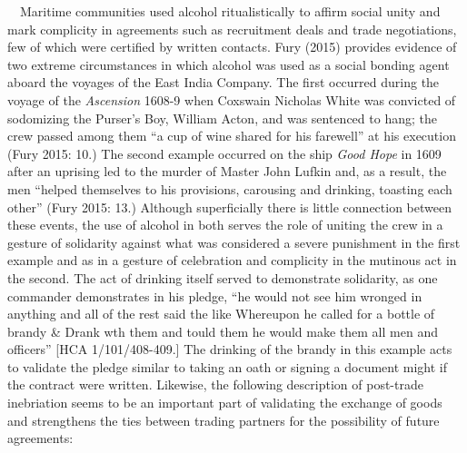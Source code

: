 \documentclass[12pt]{article}
\newenvironment{styleStandard}{\renewcommand\baselinestretch{1.0}\setlength\leftskip{0cm}\setlength\rightskip{0cm plus 1fil}\setlength\parindent{0cm}\setlength\parfillskip{0pt plus 1fil}\setlength\parskip{0in plus 1pt}\writerlistparindent\writerlistleftskip\leavevmode\normalfont\normalsize\writerlistlabel\ignorespaces}{\unskip\vspace{0in plus 1pt}\par}
\newcommand\writerlistleftskip{}
\newcommand\writerlistparindent{}
\newcommand\writerlistlabel{}
\begin{document}
\begin{styleStandard}
\ \ Maritime communities used alcohol ritualistically to affirm social unity and mark complicity in agreements such as recruitment deals and trade negotiations, few of which were certified by written contacts. Fury (2015) provides evidence of two extreme circumstances in which alcohol was used as a social bonding agent aboard the voyages of the East India Company. The first occurred during the voyage of the \textit{Ascension }1608-9 when Coxswain Nicholas White was convicted of sodomizing the Purser’s Boy, William Acton, and was sentenced to hang; the crew passed among them “a cup of wine shared for his farewell” at his execution (Fury 2015: 10.) The second example occurred on the ship \textit{Good Hope} in 1609 after an uprising led to the murder of Master John Lufkin and, as a result, the men “helped themselves to his provisions, carousing and drinking, toasting each other” (Fury 2015: 13.) Although superficially there is little connection between these events, the use of alcohol in both serves the role of uniting the crew in a gesture of solidarity against what was considered a severe punishment in the first example and as in a gesture of celebration and complicity in the mutinous act in the second. The act of drinking itself served to demonstrate solidarity, as one commander demonstrates in his pledge, “he would not see him wronged in anything and all of the rest said the like Whereupon he called for a bottle of brandy \& Drank wth them and tould them he would make them all men and officers” [HCA 1/101/408-409.] The drinking of the brandy in this example acts to validate the pledge similar to taking an oath or signing a document might if the contract were written. Likewise, the following description of post-trade inebriation seems to be an important part of validating the exchange of goods and strengthens the ties between trading partners for the possibility of future agreements:
\end{styleStandard}
\end{document}
